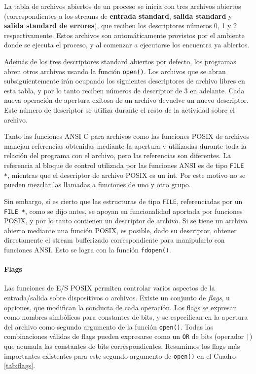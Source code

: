 La tabla de archivos abiertos de un proceso se inicia con tres archivos
abiertos (correspondientes a los streams de \textbf{entrada standard}, \textbf{salida standard} y
\textbf{salida standard de errores}), que reciben los descriptores números 0, 1 y 2
respectivamente. Estos archivos son automáticamente provistos por el ambiente donde se ejecuta el 
proceso, y al comenzar a ejecutarse los encuentra ya abiertos.

Además de los tres descriptores standard abiertos por defecto, los programas abren otros archivos 
usando la función \lstinline{open()}. 
Los archivos que se abran subsiguientemente irán ocupando los
siguientes descriptores de archivo libres en esta tabla, y por lo tanto reciben
números de descriptor de 3 en adelante. Cada nueva operación de apertura exitosa de un
archivo devuelve un nuevo descriptor. Este número de descriptor se utiliza
durante el resto de la actividad sobre el archivo.

Tanto las funciones ANSI C para archivos como las funciones POSIX de archivos
manejan referencias obtenidas mediante la apertura y utilizadas durante toda la
relación del programa con el archivo, pero las referencias son diferentes. La
referencia al bloque de control utilizada por las funciones ANSI es de tipo
\lstinline{FILE *}, mientras que el descriptor de archivo POSIX es un int. Por este motivo
no se pueden mezclar las llamadas a funciones de uno y otro grupo.

Sin embargo, sí es cierto que las estructuras de tipo \lstinline{FILE}, referenciadas por
un \lstinline{FILE *}, como se dijo antes, se apoyan en funcionalidad aportada por
funciones POSIX, y por lo tanto contienen un descriptor de archivo. Si se tiene
un archivo abierto mediante una función POSIX, es posible, dado su descriptor,
obtener directamente el stream bufferizado correspondiente para manipularlo con
funciones ANSI. Esto se logra con la función \lstinline{fdopen()}.



\paragraph{Flags}
Las funciones de E/S POSIX permiten controlar varios aspectos de la entrada/salida sobre dispositivos o archivos. Existe un conjunto de \textit{flags}, u opciones, que modifican la conducta de cada operación.   
Los flags se expresan como nombres simbólicos para constantes de bits, y se especifican en la apertura del archivo como segundo argumento de la función \lstinline{open()}. Todas las combinaciones válidas de flags pueden expresarse como un \lstinline{OR} de bits (operador \lstinline{|}) que acumula las constantes de bits correspondientes. Resumimos los flags más importantes existentes para este segundo argumento de \lstinline{open()} en el Cuadro \ref{tab:flags}.


